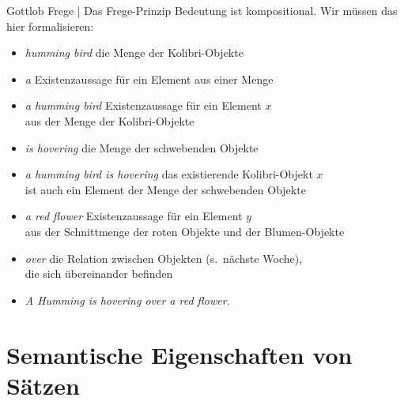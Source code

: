 \begin{frame}
  {Gottlob Frege | Das Frege-Prinzip}
  \onslide<+->
  \onslide<+->
  Bedeutung ist kompositional. Wir müssen das hier formalisieren:\\
  \Halbzeile
  \begin{itemize}[<+->]\small
    \item \textit{humming bird}  die \alert{Menge} der Kolibri-Objekte
    \item \textit{a}  \alert{Existenzaussage} für ein Element aus einer Menge
    \item \textit{a humming bird}  \alert{Existenzaussage} für ein Element $x$\\
      aus der Menge der Kolibri-Objekte
    \item \textit{is hovering}  die \alert{Menge} der schwebenden Objekte
    \item \textit{a humming bird is hovering}  das existierende Kolibri-Objekt $x$\\
      ist auch ein \alert{Element der Menge} der schwebenden Objekte
    \item \textit{a red flower}  \alert{Existenzaussage} für ein Element $y$\\
      aus der \alert{Schnittmenge} der roten Objekte und der Blumen-Objekte
    \item \textit{over}  die \alert{Relation} zwischen Objekten (s.\ nächste Woche),\\
      die sich übereinander befinden
    \item \textit{A Humming is hovering over a red flower.} \\
  \end{itemize}
\end{frame}

\section{Semantische Eigenschaften von Sätzen}

